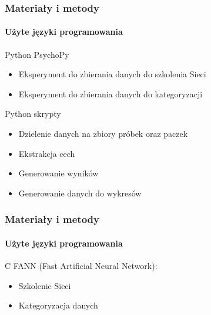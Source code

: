 \documentclass{beamer}
\begin{document}
\begin{frame}	
    \frametitle{Materiały i metody}
    \framesubtitle{Użyte języki programowania}
    \begin{block}{Python}
        \pause
        PsychoPy  \\ \pause
            \begin{itemize} [<+->]
                \item Eksperyment do zbierania danych do szkolenia Sieci
                \item Eksperyment do zbierania danych do kategoryzacji
            \end{itemize}
        \pause
        Python skrypty  \\ \pause
            \begin{itemize} [<+->]
                \item Dzielenie danych na zbiory próbek oraz paczek
                \item Ekstrakcja cech
                \item Generowanie wyników
                \item Generowanie danych do wykresów
            \end{itemize}
    \end{block}
\end{frame}

\begin{frame}	
    \frametitle{Materiały i metody}
    \framesubtitle{Użyte języki programowania}
    \pause
    \begin{block}{C}
        FANN (Fast Artificial Neural Network):  \\ \pause
            \begin{itemize} [<+->]
                \item Szkolenie Sieci	
                \item Kategoryzacja danych  				
            \end{itemize}
    \end{block}

\end{frame}
\end{document}
